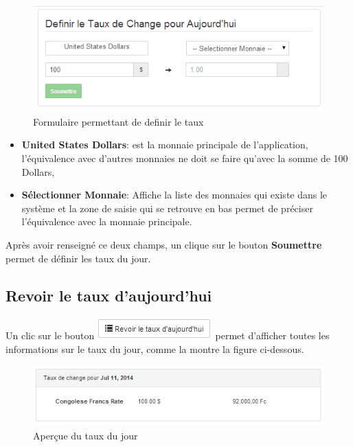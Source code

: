 \documentclass[12pt,a4paper]{report}
\begin{document}
\begin{figure}[h]
\begin{center}
\includegraphics[width=12cm]{pic/DefinirTaux.png}
\end{center}
\caption{Formulaire permettant de definir le taux}
\label{Formulaire permettant de definir le taux}
\end{figure}
\begin{itemize}
\item \textbf{United States Dollars}: est la monnaie principale de l'application, l'équivalence avec d'autres monnaies ne doit se faire qu'avec la somme de 100 Dollars,
\item \textbf{Sélectionner Monnaie}: Affiche la liste des monnaies qui existe dans le système et la zone de saisie qui se retrouve en bas permet de préciser l'équivalence avec la monnaie principale.
\end{itemize}
Après avoir renseigné ce deux champs, un clique sur le bouton \textbf{Soumettre} permet de définir les taux du jour.

\newpage
\subsection{Revoir le taux d'aujourd'hui}
Un clic sur le bouton \includegraphics[scale=0.7]{pic/RevoirTaux.png} permet d'afficher toutes les informations sur le taux du jour, comme la montre la figure ci-dessous.
\begin{figure}[h]
\begin{center}
\includegraphics[width=12cm]{pic/ShowRate.png}
\end{center}
\caption{Aperçue du taux du jour}
\label{Aperçue du taux du jour}
\end{figure}
\newpage
\end{document}
